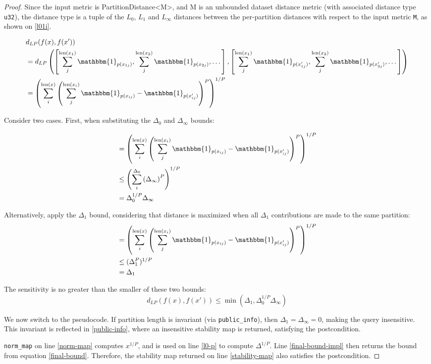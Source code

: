 \documentclass{article}
\begin{document}
\begin{proof} 
Since the input metric is PartitionDistance<M>,
and M is an unbounded dataset distance metric (with associated distance type \texttt{u32}),
the distance type is a tuple of the $L_0$, $L_1$ and $L_\infty$ distances between the per-partition distances with respect to the input metric \texttt{M},
as shown on \ref{l01i}.

\begin{align}
    &d_{LP}(f(x), f(x')) \\
    &= d_{LP}\left(\left[\sum_j^{\len(x_1)} \mathbbm{1}_{p(x_{1j})}, \sum_j^{\len(x_2)} \mathbbm{1}_{p(x_{2j})}, \dots\right], \left[\sum_j^{\len(x_1)} \mathbbm{1}_{p(x'_{1j})}, \sum_j^{\len(x_2)} \mathbbm{1}_{p(x'_{2j})}, \dots\right]\right) \\
    &= \left(\sum_i^{\len(x)}\left(\sum_j^{\len(x_i)} \mathbbm{1}_{p(x_{ij})} - \mathbbm{1}_{p(x'_{ij})}\right)^P\right)^{1/P}
\end{align}


Consider two cases. First, when substituting the $\Delta_0$ and $\Delta_\infty$ bounds:

\begin{align}
    &= \left(\sum_i^{\len(x)}\left(\sum_j^{\len(x_i)} \mathbbm{1}_{p(x_{ij})} - \mathbbm{1}_{p(x'_{ij})}\right)^P\right)^{1/P} \\
    &\leq \left(\sum_i^{\Delta_0}\left(\Delta_\infty\right)^P\right)^{1/P} \\
    &= \Delta_0^{1/P}\Delta_\infty
\end{align}

Alternatively, apply the $\Delta_1$ bound, 
considering that distance is maximized when all $\Delta_1$ contributions are made to the same partition:
\begin{align}
    &= \left(\sum_i^{\len(x)}\left(\sum_j^{\len(x_i)} \mathbbm{1}_{p(x_{ij})} - \mathbbm{1}_{p(x'_{ij})}\right)^P\right)^{1/P} \\
    &\leq (\Delta_1^P)^{1/P} \\
    &= \Delta_1
\end{align}

The sensitivity is no greater than the smaller of these two bounds:
\begin{equation}
    \label{final-bound}
    d_{LP}(f(x), f(x')) \leq \min(\Delta_1, \Delta_0^{1/P}\Delta_\infty)
\end{equation}

We now switch to the pseudocode.
If partition length is invariant (via \texttt{public\_info}), then $\Delta_1 = \Delta_\infty = 0$, making the query insensitive.
This invariant is reflected in \ref{public-info}, where an insensitive stability map is returned,
satisfying the postcondition.

\texttt{norm\_map} on line \ref{norm-map} computes $x^{1/P}$, and is used on line \ref{l0-p} to compute $\Delta^{1/P}$.
Line \ref{final-bound-impl} then returns the bound from equation \ref{final-bound}.
Therefore, the stability map returned on line \ref{stability-map} also satisfies the postcondition.

\end{proof}
\end{document}
